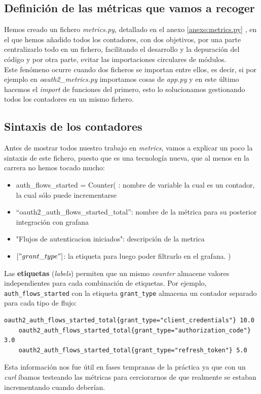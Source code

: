 \documentclass[12pt, a4paper]{article}
\begin{document}
	\subsection{Definición de las métricas que vamos a recoger}
		Hemos creado un fichero \textit{metrics.py}, detallado en el anexo \ref{anexo:metrics.py} , en el que hemos añadido todos los contadores, con dos objetivos, por una parte centralizarlo todo en un fichero, facilitando el desarrollo y la depuración del código y por otra parte, evitar las importaciones circulares de módulos.\\ 
		Este fenómeno ocurre cuando dos ficheros se importan entre ellos, es decir, si por ejemplo en \textit{oauth2\_metrics.py} importamos cosas de \textit{app.py} y en este último hacemos el \textit{import} de funciones del primero, esto lo solucionamos gestionando todos los contadores en un mismo fichero.
		
	\subsection{Sintaxis de los contadores}
		Antes de mostrar todos nuestro trabajo en \textit{metrics}, vamos a explicar un poco la sintaxis de este fichero, puesto que es una tecnología nueva, que al menos en la carrera no hemos tocado mucho:
		\begin{itemize}
			\item  auth\_flows\_started = Counter( : nombre de variable la cual es un contador, la cual sólo puede incrementarse
			\item \enquote{oauth2\_auth\_flows\_started\_total}: nombre de la métrica para su posterior integración con grafana
			\item "Flujos de autenticacion iniciados":  descripción de la metrica
			\item $["grant\_type"]$: la etiqueta para luego poder filtrarlo en el grafana.
			)
		\end{itemize}
		
		
		Las \textbf{etiquetas} (\textit{labels}) permiten que un mismo \textit{counter} almacene valores independientes para cada combinación de etiquetas. Por ejemplo, \texttt{auth\_flows\_started} con la etiqueta \texttt{grant\_type} almacena
		un contador separado para cada tipo de flujo:
\begin{lstlisting}[style=bash]
	oauth2_auth_flows_started_total{grant_type="client_credentials"} 10.0
	oauth2_auth_flows_started_total{grant_type="authorization_code"} 3.0
	oauth2_auth_flows_started_total{grant_type="refresh_token"} 5.0
\end{lstlisting}
		Esta información nos fue útil en fases tempranas de la práctica ya que con un\textit{ curl } íbamos testeando las métricas para cerciorarnos de que realmente se estaban incrementando cuando deberían.
\end{document}
